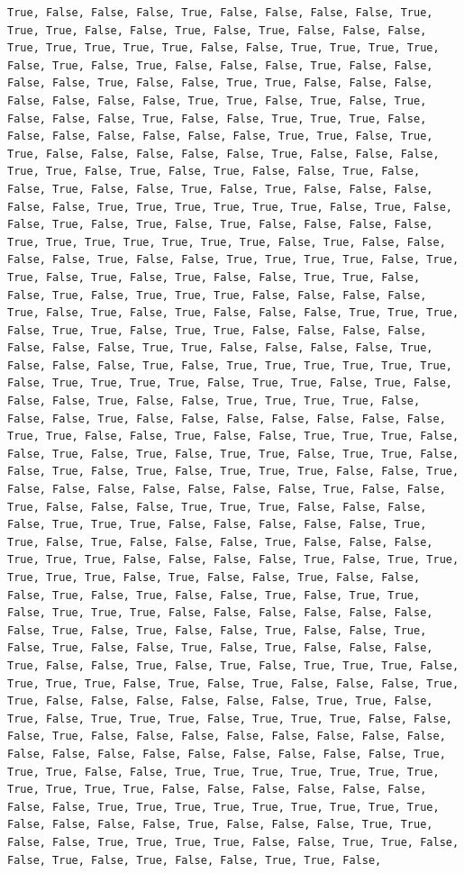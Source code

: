 \documentclass[
  letterpaper,
  DIV=11,
  numbers=noendperiod]{scrartcl}
\begin{document}
\begin{verbatim}
True, False, False, False, True, False, False, False, False, True, True, True, False, False, True, False, True, False, False, False, True, True, True, True, True, False, False, True, True, True, True, False, True, False, True, False, False, False, True, False, False, False, False, True, False, False, True, True, False, False, False, False, False, False, False, True, True, False, True, False, True, False, False, False, True, False, False, True, True, True, False, False, False, False, False, False, False, True, True, False, True, True, False, False, False, False, False, True, False, False, False, True, True, False, True, False, True, False, False, True, False, False, True, False, False, True, False, True, False, False, False, False, False, True, True, True, True, True, True, False, True, False, False, True, False, True, False, True, False, False, False, False, True, True, True, True, True, True, True, False, True, False, False, False, False, True, False, False, True, True, True, True, False, True, True, False, True, False, True, False, False, True, True, False, False, True, False, True, True, True, False, False, False, False, True, False, True, False, True, False, False, False, True, True, True, False, True, True, False, True, True, False, False, False, False, False, False, False, True, True, False, False, False, False, True, False, False, False, True, False, True, True, True, True, True, True, False, True, True, True, True, False, True, True, False, True, False, False, False, True, False, False, True, True, True, True, False, False, False, True, False, False, False, False, False, False, False, True, True, False, False, True, False, False, True, True, True, False, False, True, False, True, False, True, True, False, True, True, False, False, True, False, True, False, True, True, True, False, False, True, False, False, False, False, False, False, False, True, False, False, True, False, False, False, True, True, True, False, False, False, False, True, True, True, False, False, False, False, False, True, True, False, True, False, False, False, True, False, False, False, True, True, True, False, False, False, False, True, False, True, True, True, True, True, False, True, False, False, True, False, False, False, True, False, True, False, False, True, False, True, True, False, True, True, True, False, False, False, False, False, False, False, True, False, True, False, False, True, False, False, True, False, True, False, False, True, False, True, False, False, False, True, False, False, True, False, True, False, True, True, True, False, True, True, True, False, True, False, True, False, False, False, True, True, False, False, False, False, False, False, True, True, False, True, False, True, True, True, False, True, True, True, False, False, False, True, False, False, False, False, False, False, False, False, False, False, False, False, False, False, False, False, False, True, True, True, False, False, True, True, True, True, True, True, True, True, True, True, True, False, False, False, False, False, False, False, False, True, True, True, True, True, True, True, True, True, False, False, False, False, True, False, False, False, True, True, False, False, True, True, True, True, False, False, True, True, False, False, True, False, True, False, False, True, True, False, 
\end{verbatim}
\end{document}
